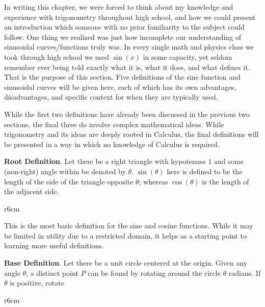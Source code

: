\documentclass[../book.tex]{subfiles}
\begin{document}
In writing this chapter, we were forced to think about my knowledge and experience with trigonometry throughout high school, and how we could present an introduction which someone with no prior familiarity to the subject could follow. One thing we realized was just how incomplete our understanding of sinusoidal curves/functions truly was. In every single math and physics class we took through high school we used $\sin⁡(x)$ in some capacity, yet seldom remember ever being told exactly what it is, what it does, and what defines it. That is the purpose of this section. Five definitions of the sine function and sinusoidal curves will be given here, each of which has its own advantages, disadvantages, and specific context for when they are typically used.

\begin{remark}
While the first two definitions have already been discussed in the previous two sections, the final three do involve complex mathematical ideas. While trigonometry and its ideas are deeply rooted in Calculus, the final definitions will be presented in a way in which no knowledge of Calculus is required.
\end{remark}

\textbf{Root Definition}. Let there be a right triangle with hypotenuse $1$ and some (non-right) angle within be denoted by $\theta$. $\sin(\theta)$ here is defined to be the length of the side of the triangle opposite $\theta$; whereas $\cos(\theta)$ is the length of the adjacent side.

\begin{wrapfigure}{r}{6cm}
\end{wrapfigure}

This is the most basic definition for the sine and cosine functions. While it may be limited in utility due to a restricted domain, it helps as a starting point to learning more useful definitions.

\textbf{Base Definition}. Let there be a unit circle centered at the origin.  Given any angle $\theta$, a distinct point $P$ can be found by rotating around the circle $\theta$ radians.  If $\theta$ is positive, rotate

\begin{wrapfigure}{r}{6cm}
\end{wrapfigure}
\end{document}

